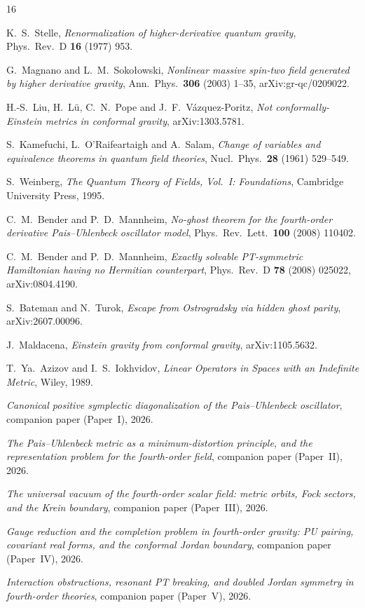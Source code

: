 \documentclass[11pt]{article}
\theoremstyle{definition}
\theoremstyle{remark}
\begin{document}
\begin{thebibliography}{16}

K.~S.~Stelle,
\emph{Renormalization of higher-derivative quantum gravity},
Phys.\ Rev.\ D \textbf{16} (1977) 953.

G.~Magnano and L.~M.~Soko\l{}owski,
\emph{Nonlinear massive spin-two field generated by higher derivative
gravity},
Ann.\ Phys.\ \textbf{306} (2003) 1--35,
arXiv:gr-qc/0209022.

H.-S.~Liu, H.~L\"u, C.~N.~Pope and J.~F.~V\'azquez-Poritz,
\emph{Not conformally-Einstein metrics in conformal gravity},
arXiv:1303.5781.

S.~Kamefuchi, L.~O'Raifeartaigh and A.~Salam,
\emph{Change of variables and equivalence theorems in quantum field
theories},
Nucl.\ Phys.\ \textbf{28} (1961) 529--549.

S.~Weinberg,
\emph{The Quantum Theory of Fields, Vol.~I: Foundations},
Cambridge University Press, 1995.

C.~M.~Bender and P.~D.~Mannheim,
\emph{No-ghost theorem for the fourth-order derivative Pais--Uhlenbeck
oscillator model},
Phys.\ Rev.\ Lett.\ \textbf{100} (2008) 110402.

C.~M.~Bender and P.~D.~Mannheim,
\emph{Exactly solvable PT-symmetric Hamiltonian having no Hermitian
counterpart},
Phys.\ Rev.\ D \textbf{78} (2008) 025022, arXiv:0804.4190.

S.~Bateman and N.~Turok,
\emph{Escape from Ostrogradsky via hidden ghost parity},
arXiv:2607.00096.

J.~Maldacena,
\emph{Einstein gravity from conformal gravity},
arXiv:1105.5632.

T.~Ya.~Azizov and I.~S.~Iokhvidov,
\emph{Linear Operators in Spaces with an Indefinite Metric},
Wiley, 1989.

\emph{Canonical positive symplectic diagonalization of the
Pais--Uhlenbeck oscillator}, companion paper (Paper~I), 2026.

\emph{The Pais--Uhlenbeck metric as a minimum-distortion principle, and
the representation problem for the fourth-order field}, companion paper
(Paper~II), 2026.

\emph{The universal vacuum of the fourth-order scalar field: metric
orbits, Fock sectors, and the Krein boundary}, companion paper
(Paper~III), 2026.

\emph{Gauge reduction and the completion problem in fourth-order
gravity: PU pairing, covariant real forms, and the conformal Jordan
boundary}, companion paper (Paper~IV), 2026.

\emph{Interaction obstructions, resonant PT breaking, and doubled Jordan
symmetry in fourth-order theories}, companion paper (Paper~V), 2026.

\end{thebibliography}
\end{document}
